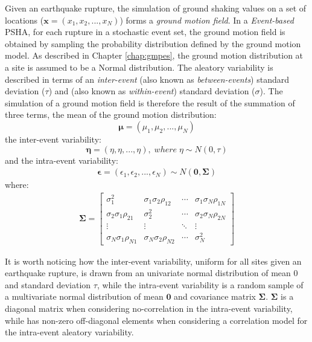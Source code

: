 Given an earthquake rupture, the simulation of ground shaking values on a set of locations ($\bm{x}=(x_{1}, x_{2}, ..., x_{N})$)
forms a \textit{ground motion field}. In a \textit{Event-based} PSHA, for each rupture in a stochastic event set,
the ground motion field is obtained by sampling the probability distribution defined by the ground motion model.
As described in Chapter \ref{chap:gmpes}, the ground motion distribution at a site is assumed to be a Normal
distribution. The aleatory variability is described in terms of an \textit{inter-event} (also known as \textit{between-events})
standard deviation ($\tau$) and  (also known as \textit{within-event}) standard deviation ($\sigma$).
The simulation of a ground motion field is therefore the result of the summation of three terms, the mean of the
ground motion distribution:
\begin{equation}
\bm\mu = (\mu_{1}, \mu_{2}, ..., \mu_{N})
\end{equation}
the inter-event variability:
\begin{equation}
\bm\eta = (\eta, \eta, ..., \eta),\;where\;\eta\sim N(0, \tau)
\end{equation}
and the intra-event variability:
\begin{align}
\bm\epsilon = (\epsilon_{1}, \epsilon_{2}, ..., \epsilon_{N}) \sim N(\bm{0}, \bm\Sigma)
\end{align}
where:
\begin{align}
\bm\Sigma = 
\begin{bmatrix}
\sigma_{1}^2&\sigma_{1}\sigma_{2}\rho_{12}&\cdots &\sigma_{1}\sigma_{N}\rho_{1N} \\
\sigma_{2}\sigma_{1}\rho_{21}&\sigma_{2}^2&\cdots &\sigma_{2}\sigma_{N}\rho_{2N} \\
\vdots & \vdots & \ddots & \vdots\\
\sigma_{N}\sigma_{1}\rho_{N1}&\sigma_{N}\sigma_{2}\rho_{N2}&\cdots &\sigma_{N}^2
\end{bmatrix}
\end{align}

It is worth noticing how the inter-event variability, uniform for all sites given an earthquake rupture, is drawn
from an univariate normal distribution of mean 0 and standard deviation $\tau$, while the intra-event variability
is a random sample of a multivariate normal distribution of mean $\bm{0}$ and covariance matrix $\bm\Sigma$.
$\bm\Sigma$ is a diagonal matrix when considering no-correlation in the intra-event variability, while has non-zero
off-diagonal elements when considering a correlation model for the intra-event aleatory variability.

